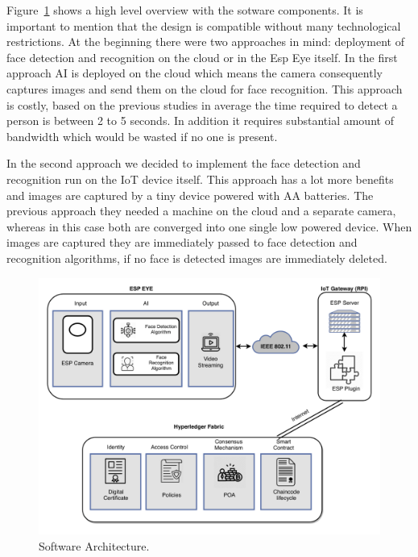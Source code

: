 Figure~\ref{fig:surveillance2} shows a high level overview with the sotware components. It is important to mention that the design is compatible without many technological restrictions. At the beginning there were two approaches in mind: deployment of face detection and recognition on the cloud or in the Esp Eye itself. In the first approach AI is deployed on the cloud which means the camera consequently captures images and send them on the cloud for face recognition. This approach is costly, based on the previous studies in average the time required to detect a person is between 2 to 5 seconds. In addition it requires substantial amount of bandwidth which would be wasted if no one is present.

In the second approach we decided to implement the face detection and recognition run on the IoT device itself. This approach has a lot more benefits and images are captured by a tiny device powered with AA batteries. The previous approach they needed a machine on the cloud and a separate camera, whereas in this case both are converged into one single low powered device. When images are captured they are immediately passed to face detection and recognition algorithms, if no face is detected images are immediately deleted. 



\begin{figure}[!htb]
    \centering
    \includegraphics[width=1\textwidth]{figures/esp2.png}
    \caption{Software Architecture.}
    \label{fig:surveillance2}
\end{figure}


